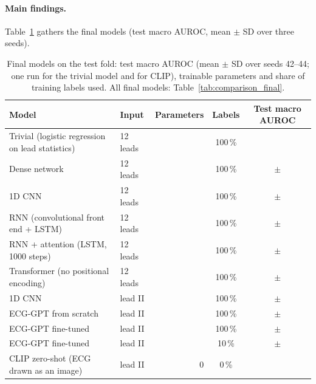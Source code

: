 \paragraph{Main findings.} Table~\ref{tab:summary} gathers the final models (test macro AUROC, mean
$\pm$ SD over three seeds).
\begin{table}[htbp]
\centering
\caption[Summary of the final models (test)]{Final models on the test fold: test macro AUROC (mean $\pm$
SD over seeds 42--44; one run for the trivial model and for CLIP), trainable parameters and share of
training labels used. All final models: Table~\ref{tab:comparison_final}.}
\label{tab:summary}
\small
\begin{tabular}{llrcc}
\toprule
Model & Input & Parameters & Labels & Test macro AUROC \\
\midrule
Trivial (logistic regression on lead statistics) & 12 leads & \comparisonParamsTrivial{} & 100\,\% & \comparisonTestAurocMeanTrivial{} \\
Dense network & 12 leads & \comparisonParamsTwelveDense{} & 100\,\% & \comparisonTestAurocMeanTwelveDense{} $\pm$ \comparisonTestAurocSdTwelveDense{} \\
1D CNN & 12 leads & \comparisonParamsTwelveCnn{} & 100\,\% & \comparisonTestAurocMeanTwelveCnn{} $\pm$ \comparisonTestAurocSdTwelveCnn{} \\
RNN (convolutional front end + LSTM) & 12 leads & \comparisonParamsTwelveRnn{} & 100\,\% & \comparisonTestAurocMeanTwelveRnn{} $\pm$ \comparisonTestAurocSdTwelveRnn{} \\
RNN + attention (LSTM, 1000 steps) & 12 leads & \comparisonParamsTwelveRnnattn{} & 100\,\% & \comparisonTestAurocMeanTwelveRnnattn{} $\pm$ \comparisonTestAurocSdTwelveRnnattn{} \\
Transformer (no positional encoding) & 12 leads & \comparisonParamsTwelveTransformer{} & 100\,\% & \comparisonTestAurocMeanTwelveTransformer{} $\pm$ \comparisonTestAurocSdTwelveTransformer{} \\
\midrule
1D CNN & lead II & \comparisonParamsOneleadCnn{} & 100\,\% & \comparisonTestAurocMeanOneleadCnn{} $\pm$ \comparisonTestAurocSdOneleadCnn{} \\
ECG-GPT from scratch & lead II & \comparisonParamsScratchFOneZeroZero{} & 100\,\% & \comparisonTestAurocMeanScratchFOneZeroZero{} $\pm$ \comparisonTestAurocSdScratchFOneZeroZero{} \\
ECG-GPT fine-tuned & lead II & \comparisonParamsFinetuneFOneZeroZero{} & 100\,\% & \comparisonTestAurocMeanFinetuneFOneZeroZero{} $\pm$ \comparisonTestAurocSdFinetuneFOneZeroZero{} \\
ECG-GPT fine-tuned & lead II & \comparisonParamsFinetuneFOneZero{} & 10\,\% & \comparisonTestAurocMeanFinetuneFOneZero{} $\pm$ \comparisonTestAurocSdFinetuneFOneZero{} \\
CLIP zero-shot (ECG drawn as an image) & lead II & 0 & 0\,\% & \comparisonTestAurocMeanZeroshot{} \\
\bottomrule
\end{tabular}
\end{table}
